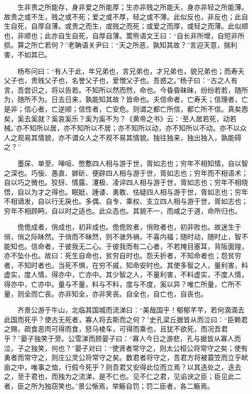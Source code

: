 　　生非贵之所能存，身非爱之所能厚；生亦非贱之所能夭，身亦非轻之所能薄。故贵之或不生，贱之或不死；爱之或不厚，轻之或不薄。此似反也，非反也；此自生自死，自厚自薄。或贵之而生，或贱之而死；或爱之而厚，或轻之而薄。此似顺也，非顺也；此亦自生自死，自厚自薄。鬻熊语文王曰：``自长非所增，自短非所损。算之所亡若何？''老聃语关尹曰：``天之所恶，孰知其故？''言迎天意，揣利害，不如其已。

　　杨布问曰：``有人于此，年兄弟也，言兄弟也，才兄弟也，貌兄弟也；而寿夭父子也，贵贱父子也，名誉父子也，爱憎父子也。吾惑之。''杨子曰：``古之人有言，吾尝识之，将以告若。不知所以然而然，命也。今昏昏昧昧，纷纷若若，随所为，随所不为。日去日来，孰能知其故？皆命也。夫信命者，亡寿夭；信理者，亡是非；信心者，亡逆顺；信性者，亡安危。则谓之都亡所信，都亡所不信。真矣悫矣，奚去奚就？奚哀奚乐？奚为奚不为？《黄帝之书》云：`至人居若死，动若械。'亦不知所以居，亦不知所以不居；亦不知所以动，亦不知所以不动。亦不以众人之观易其情貌，亦不谓众人之不观不易其情貌。独往独来，独出独入，孰能碍之？''

　　墨杘、单至、啴咺、憋懯四人相与游于世，胥如志也；穷年不相知情，自以智之深也。巧佞、愚直、婩斫、便辟四人相与游于世，胥如志也；穷年而不相语术；自以巧之微也。狡犽、情露、瀽极、凌谇四人相与游于世，胥如志也；穷年不相晓悟，自以为才之得也。眠娗、諈诿、勇敢、怯疑四人相与游于世，胥如志也；穷年不相谪发，自以行无戾也。多偶、自专、乘权、支立四人相与游于世，胥如志也；穷年不相顾眄，自以时之适也。此众态也。其貌不一，而咸之于道，命所归也。

　　佹佹成者，俏成也，初非成也。佹佹败者，俏败者也，初非败也。故迷生于俏，俏之际昧然。于俏而不昧然，则不骇外祸，不喜内福；随时动，随时止，智不能知也。信命者，于彼我无二心。于彼我而有二心者，不若掩目塞耳，背阪面隍，亦不坠仆也。故曰：死生自命也，贫穷自时也。怨夭折者，不知命者也；怨贫穷者，不知时者也。当死不惧，在穷不戚，知命安时也。其使多智之人，量利害，料虚实，度人情，得亦中，亡亦中。其少智之人，不量利害，不料虚实，不度人情，得亦中，亡亦中。量与不量，料与不料，度与不度，奚以异？唯亡所量，亡所不量，则全而亡丧。亦非知全，亦非笑丧。自全也，自亡也，自丧也。

　　齐景公游于牛山，北临其国城而流涕曰：``美哉国乎！郁郁芊芊，若何滴滴去此国而死乎？使古无死者，寡人将去斯而之何？''史孔梁丘据皆从而泣曰：``臣赖君之赐，疏食恶肉可得而食，怒马棱车，可得而乘也，且犹不欲死，而况吾君乎？''晏子独笑于旁。公雪涕而顾晏子曰：``寡人今日之游悲，孔与据皆从寡人而泣，子之独笑，何也？''晏子对曰：``使贤者常守之，则太公桓公将常守之矣；使有勇者而常守之，则庄公灵公将常守之矣。数君者将守之，吾君方将被蓑笠而立乎畎亩之中，唯事之恤，行假今死乎？则吾君又安得此位而立焉？以其迭处之，迭去之，至于君也，而独为之流涕，是不仁也。见不仁之君，见谄谀之臣；臣见此二者，臣之所为独窃笑也。''景公惭焉，举觞自罚；罚二臣者，各二觞焉。

